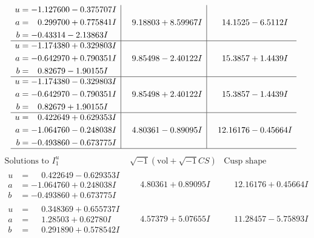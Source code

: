 \documentclass[1p]{elsarticle_modified}
\theoremstyle{definition}
\newcommand{\I}{\sqrt{-1}}
\begin{document}
$$\begin{array}{c|c|c}
\begin{aligned}
u &= -1.127600 - 0.375707 I \\
a &= \phantom{-}0.299700 + 0.775841 I \\
b &= -0.43314 - 2.13863 I\end{aligned}
 & \phantom{-}9.18803 + 8.59967 I & \phantom{-}14.1525 - 6.5112 I \\ \hline\begin{aligned}
u &= -1.174380 + 0.329803 I \\
a &= -0.642970 + 0.790351 I \\
b &= \phantom{-}0.82679 - 1.90155 I\end{aligned}
 & \phantom{-}9.85498 - 2.40122 I & \phantom{-}15.3857 + 1.4439 I \\ \hline\begin{aligned}
u &= -1.174380 - 0.329803 I \\
a &= -0.642970 - 0.790351 I \\
b &= \phantom{-}0.82679 + 1.90155 I\end{aligned}
 & \phantom{-}9.85498 + 2.40122 I & \phantom{-}15.3857 - 1.4439 I \\ \hline\begin{aligned}
u &= \phantom{-}0.422649 + 0.629353 I \\
a &= -1.064760 - 0.248038 I \\
b &= -0.493860 - 0.673775 I\end{aligned}
 & \phantom{-}4.80361 - 0.89095 I & \phantom{-}12.16176 - 0.45664 I\\
 \hline 
 \end{array}$$\newpage$$\begin{array}{c|c|c}  
\text{Solutions to }I^u_{1}& \I (\text{vol} + \sqrt{-1}CS) & \text{Cusp shape}\\
 \hline 
\begin{aligned}
u &= \phantom{-}0.422649 - 0.629353 I \\
a &= -1.064760 + 0.248038 I \\
b &= -0.493860 + 0.673775 I\end{aligned}
 & \phantom{-}4.80361 + 0.89095 I & \phantom{-}12.16176 + 0.45664 I \\ \hline\begin{aligned}
u &= \phantom{-}0.348369 + 0.655737 I \\
a &= \phantom{-}1.28503 + 0.62780 I \\
b &= \phantom{-}0.291890 + 0.578542 I\end{aligned}
 & \phantom{-}4.57379 + 5.07655 I & \phantom{-}11.28457 - 5.75893 I \\ \hline\begin{aligned}

\end{aligned}
\end{array}$$
\end{document}
